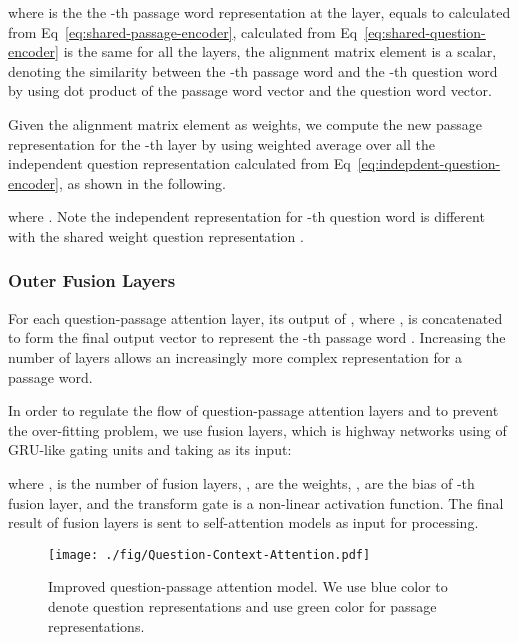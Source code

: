 \documentclass{article} \usepackage{arxiv, times}
\begin{document}
where  is the the -th passage word representation at the  layer,  equals to  calculated from Eq~\ref{eq:shared-passage-encoder},  calculated from Eq~\ref{eq:shared-question-encoder} is the same for all the layers, the alignment matrix element  is a scalar, denoting the similarity between the -th passage word and the -th question word by using dot product of the passage word vector and the question word vector.

Given the alignment matrix element as weights, we compute the new passage representation  for the -th layer by using weighted average over all the independent question representation  calculated from Eq~\ref{eq:indepdent-question-encoder}, as shown in the following. 

where . Note the independent representation  for -th question word is different with the shared weight question representation .

\subsubsection{Outer Fusion Layers}\label{sec:question-passage-att-fusion}
For each question-passage attention layer, its output of , where , is concatenated to form the final output vector to represent the -th passage word . Increasing the number of layers  allows an increasingly more complex representation for a passage word. 

In order to regulate the flow of  question-passage attention layers and to prevent the over-fitting problem, we use fusion layers, which is highway networks \citep{SrivastavaGS15} using of GRU-like gating units and taking  as its input:

where 
,  is the number of fusion layers, ,  are the weights, ,  are the bias of -th fusion layer, and the transform gate  is a non-linear activation function. The final result of fusion layers  is sent to self-attention models as input for processing. 





\begin{figure}[t]
    \centering
    \texttt{[image: ./fig/Question-Context-Attention.pdf]}
    \caption{Improved question-passage attention model. We use blue color to denote question representations and use green color for passage representations.}
    \label{fig:question-passage-attention}
\end{figure}
\end{document}
